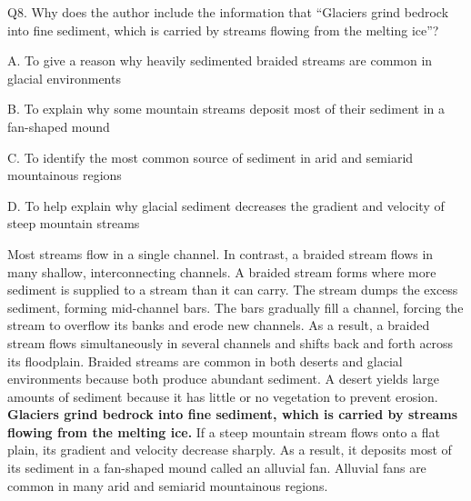 \begin{blk}
    \begin{qst}
        Q8. Why does the author include the information that “Glaciers grind bedrock into fine sediment, which is carried by streams flowing from the melting ice”?
    \end{qst}

    \begin{chc}
        A.
        To give a reason why heavily sedimented braided streams are common in glacial environments

        B.
        To explain why some mountain streams deposit most of their sediment in a fan-shaped mound

        C.
        To identify the most common source of sediment in arid and semiarid mountainous regions

        D.
        To help explain why glacial sediment decreases the gradient and velocity of steep mountain streams
    \end{chc}

    \begin{psgq}
        Most streams flow in a single channel. In contrast, a braided stream flows in many shallow, interconnecting channels. A braided stream forms where more sediment is supplied to a stream than it can carry. The stream dumps the excess sediment, forming mid-channel bars. The bars gradually fill a channel, forcing the stream to overflow its banks and erode new channels. As a result, a braided stream flows simultaneously in several channels and shifts back and forth across its floodplain. Braided streams are common in both deserts and glacial environments because both produce abundant sediment. A desert yields large amounts of sediment because it has little or no vegetation to prevent erosion. \textbf{Glaciers grind bedrock into fine sediment, which is carried by streams flowing from the melting ice.} If a steep mountain stream flows onto a flat plain, its gradient and velocity decrease sharply. As a result, it deposits most of its sediment in a fan-shaped mound called an alluvial fan. Alluvial fans are common in many arid and semiarid mountainous regions.
    \end{psgq}


\end{blk}
